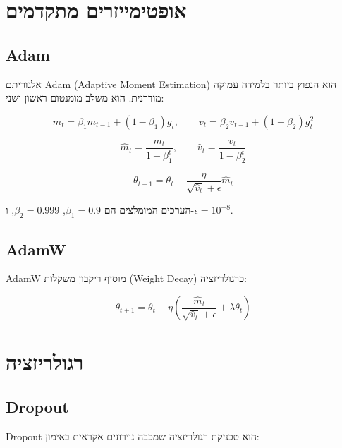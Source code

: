 \section{אופטימייזרים מתקדמים}

\subsection{\textenglish{Adam}}

אלגוריתם \textenglish{Adam} (\textenglish{Adaptive Moment Estimation})
הוא הנפוץ ביותר בלמידה עמוקה מודרנית. הוא משלב מומנטום ראשון ושני:

\begin{equation}
    m_t = \beta_1 m_{t-1} + (1 - \beta_1) g_t, \qquad
    v_t = \beta_2 v_{t-1} + (1 - \beta_2) g_t^2
\end{equation}

\begin{equation}
    \hat{m}_t = \frac{m_t}{1 - \beta_1^t}, \qquad
    \hat{v}_t = \frac{v_t}{1 - \beta_2^t}
\end{equation}

\begin{equation}
    \theta_{t+1} = \theta_t - \frac{\eta}{\sqrt{\hat{v}_t} + \epsilon} \hat{m}_t
\end{equation}

הערכים המומלצים הם \(\beta_1 = 0.9\), \(\beta_2 = 0.999\), ו-\(\epsilon = 10^{-8}\).

\subsection{\textenglish{AdamW}}

\textenglish{AdamW} מוסיף ריקבון משקלות (\textenglish{Weight Decay}) כרגולריזציה:

\begin{equation}
    \theta_{t+1} = \theta_t - \eta \left( \frac{\hat{m}_t}{\sqrt{\hat{v}_t} + \epsilon}
    + \lambda \theta_t \right)
\end{equation}

\section{רגולריזציה}

\subsection{\textenglish{Dropout}}

\textenglish{Dropout} הוא טכניקת רגולריזציה שמכבה נוירונים אקראית באימון:

